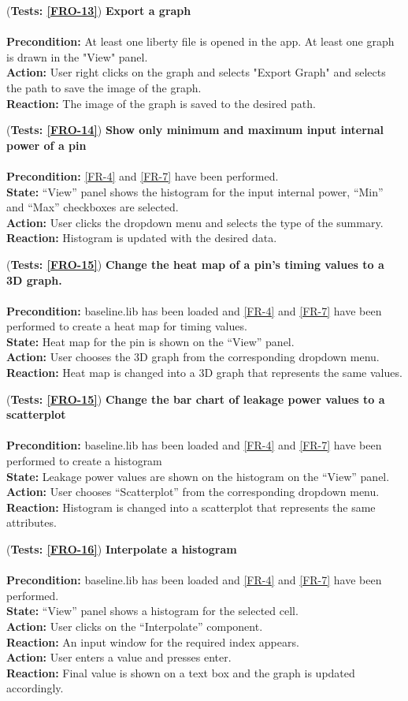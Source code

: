 \documentclass[10pt,a4paper]{report}
\newcommand{\precondition}[1]{
    \textbf{Precondition: } #1 \leavevmode \\
}
\newcommand{\action}[1]{
    \textbf{Action: } #1 \leavevmode \\
}
\newcommand{\state}[1]{
    \textbf{State: } #1 \leavevmode \\
}
\newcommand{\reaction}[1]{
    \textbf{Reaction: } #1 \leavevmode \\
}
\newcommand{\GTCODescription}[2]{
    (\textbf{Tests: #1}) \textbf{#2} \leavevmode \\
}
\begin{document}
\begin{GTCO}
    \item \GTCODescription{\ref{FRO-13}}{Export a graph} \leavevmode \\ \precondition{At least one liberty file is opened in the app. At least one graph is drawn in the "View" panel.}\action{User right clicks on the graph and selects "Export Graph" and selects the path to save the image of the graph.}\reaction{The image of the graph is saved to the desired path.}
    
    \item \GTCODescription{\ref{FRO-14}}{Show only minimum and maximum input internal power of a pin} \leavevmode \\ \precondition{\ref{FR-4} and \ref{FR-7} have been performed.}\state{“View” panel shows the histogram for the input internal power, “Min” and “Max” checkboxes are selected.}\action{User clicks the dropdown menu and selects the type of the summary.}\reaction{Histogram is updated with the desired data.}
  
   \item \GTCODescription{\ref{FRO-15}}{Change the heat map of a pin’s timing values to a 3D graph.} \leavevmode \\ \precondition{baseline.lib has been loaded and \ref{FR-4} and \ref{FR-7} have been performed to create a heat map for timing values.}\state{Heat map for the pin is shown on the “View” panel.}\action{User chooses the 3D graph from the corresponding dropdown menu.}\reaction{Heat map is changed into a 3D graph that represents the same values.}
    
    \item \GTCODescription{\ref{FRO-15}}{Change the bar chart of leakage power values to a scatterplot} \leavevmode \\ \precondition{baseline.lib has been loaded and \ref{FR-4} and \ref{FR-7} have been performed to create a histogram}\state{Leakage power values are shown on the histogram on the “View” panel.}\action{User chooses “Scatterplot” from the corresponding dropdown menu.}\reaction{Histogram is changed into a scatterplot that represents the same attributes.}
    
    \item \GTCODescription{\ref{FRO-16}}{Interpolate a histogram} \leavevmode \\ \precondition{baseline.lib has been loaded and \ref{FR-4} and \ref{FR-7} have been performed.}\state{“View” panel shows a histogram for the selected cell.}\action{User clicks on the “Interpolate” component.}\reaction{An input window for the required index appears.}\action{User enters a value and presses enter.}\reaction{Final value is shown on a text box and the graph is updated accordingly.}
    

\end{GTCO}
\end{document}

